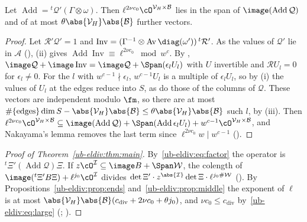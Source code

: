 \begin{proposition}
\label{ub-eldiv:prop:middle}
Let $\operatorname{Add}={}^t\mathcal Q'(\Gamma\otimes\omega)$. Then $\ell^{2\nu c_0}\cO^{\mathcal V_H\times\mathcal B}$ lies
in the span of $\image(\operatorname{Add}\mathcal Q)$ and of at most $\theta\abs{\mathcal V_H}\abs{\mathcal B}$ further
vectors.
\end{proposition}

\begin{proof}
Let $\mathcal R'\mathcal Q'=1$ and $\operatorname{Inv}=(\Gamma^{-1}\otimes\operatorname{Av}\diag(\omega'))
\,{}^t\mathcal R'$. As the values of $\mathcal Q'$ lie in $\mathcal A$
(), (ii) gives
$\operatorname{Add}\operatorname{Inv}\equiv \ell^{2\nu c_0}\bmod w^c$. By
, $\image \mathcal Q+\image\operatorname{Inv}=\image
\mathcal Q+\Span(\epsilon_lU_l)$ with $U$ invertible and $\mathcal RU_l=0$ for $\epsilon_l\ne0$. For the $l$ with
$w^{c-1}\nmid\epsilon_l$, $w^{c-1}U_l$ is a multiple of $\epsilon_lU_l$, so by (i) the values of
$U_l$ at the edges reduce into $S$, as do those of the columns of $\mathcal Q$. These vectors are independent
modulo $\fm$, so there are at most $\#\{\text{edges}\}\dim S-\abs{\mathcal V_H}\abs{\mathcal
B}\le\theta\abs{\mathcal V_H}\abs{\mathcal B}$ such $l$, by (iii). Then $\ell^{2\nu c_0}\cO^{\mathcal V_H\times\mathcal
B}\subseteq\image(\operatorname{Add}\mathcal Q)+\Span(\operatorname{Add}\epsilon_lU_l)+w^{c-1}\cO^{\mathcal V_H\times
\mathcal B}$, and Nakayama's lemma removes the last term since $\ell^{2\nu c_0}w\mid w^{c-1}$
().
\end{proof}

\begin{proof}[Proof of Theorem~\ref{ub-eldiv:thm:main}]
By~\eqref{ub-eldiv:eq:factor} the operator is ${}^t\Xi'(\operatorname{Add}\mathcal Q)\Xi$. If
$z\cO^{\mathcal I}\subseteq\image B+\Span\mathcal W$, the colength of
$\image({}^t\Xi'B\Xi)+\ell^{j_0}\cO^{\mathcal I}$ divides $\det\Xi'\cdot
z^{\abs{\mathcal I}}\det\Xi\cdot \ell^{j_0\#\mathcal W}$
(). By
Propositions~\ref{ub-eldiv:prop:ends} and~\ref{ub-eldiv:prop:middle} the exponent of $\ell$ is at most
$\abs{\mathcal V_H}\abs{\mathcal B}(c_{\mathrm{div}}+2\nu c_0+\theta j_0)$, and $\nu c_0\le c_{\mathrm{div}}$
by~\eqref{ub-eldiv:eq:large} (;
).
\end{proof}


